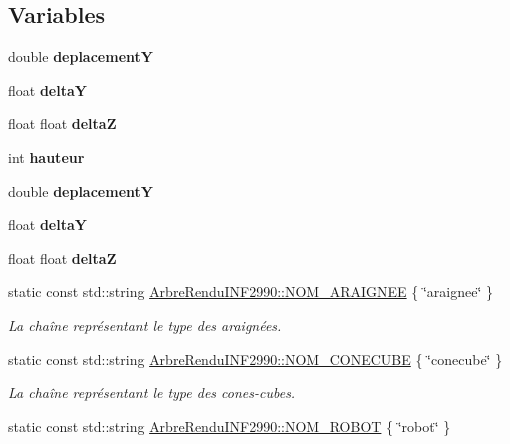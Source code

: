 \subsection*{Variables}
\begin{DoxyCompactItemize}
\item 
double {\bfseries deplacement\-Y}
\item 
float {\bfseries delta\-Y}
\item 
float float {\bfseries delta\-Z}
\item 
\hypertarget{group__inf2990_ga5e94a2f98c16e8b6860f95c99da1c0d3}{int {\bfseries hauteur}}\label{group__inf2990_ga5e94a2f98c16e8b6860f95c99da1c0d3}

\item 
\hypertarget{group__inf2990_ga84b180f09e9802d980aa3f7cc71703da}{double {\bfseries deplacement\-Y}}\label{group__inf2990_ga84b180f09e9802d980aa3f7cc71703da}

\item 
\hypertarget{group__inf2990_ga3cffe82b93dca31f1da5bcde540a5f96}{float {\bfseries delta\-Y}}\label{group__inf2990_ga3cffe82b93dca31f1da5bcde540a5f96}

\item 
\hypertarget{group__inf2990_ga9644447719a7934b7eca34bdf6656363}{float float {\bfseries delta\-Z}}\label{group__inf2990_ga9644447719a7934b7eca34bdf6656363}

\item 
\hypertarget{group__inf2990_ga1035430c1c08b95d17f891ae89b33b80}{static const std\-::string \hyperlink{group__inf2990_ga1035430c1c08b95d17f891ae89b33b80}{Arbre\-Rendu\-I\-N\-F2990\-::\-N\-O\-M\-\_\-\-A\-R\-A\-I\-G\-N\-E\-E} \{ \char`\"{}araignee\char`\"{} \}}\label{group__inf2990_ga1035430c1c08b95d17f891ae89b33b80}

\begin{DoxyCompactList}\small\item\em La chaîne représentant le type des araignées. \end{DoxyCompactList}\item 
\hypertarget{group__inf2990_gae849656178f4dad34106f525bf37341a}{static const std\-::string \hyperlink{group__inf2990_gae849656178f4dad34106f525bf37341a}{Arbre\-Rendu\-I\-N\-F2990\-::\-N\-O\-M\-\_\-\-C\-O\-N\-E\-C\-U\-B\-E} \{ \char`\"{}conecube\char`\"{} \}}\label{group__inf2990_gae849656178f4dad34106f525bf37341a}

\begin{DoxyCompactList}\small\item\em La chaîne représentant le type des cones-\/cubes. \end{DoxyCompactList}\item 
\hypertarget{group__inf2990_ga9a6799aa8903b858929bf675e4468aac}{static const std\-::string \hyperlink{group__inf2990_ga9a6799aa8903b858929bf675e4468aac}{Arbre\-Rendu\-I\-N\-F2990\-::\-N\-O\-M\-\_\-\-R\-O\-B\-O\-T} \{ \char`\"{}robot\char`\"{} \}}\label{group__inf2990_ga9a6799aa8903b858929bf675e4468aac}


\end{DoxyCompactItemize}
